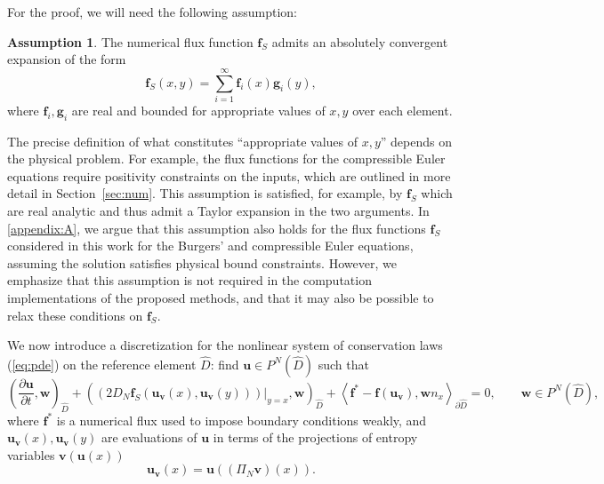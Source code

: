 \documentclass[preprint,10pt]{elsarticle}
\theoremstyle{definition}
\theoremstyle{lemma}
\theoremstyle{theorem}
\theoremstyle{assumption}
\newtheorem{assumption}{Assumption}
\newcommand{\pd}[2]{\frac{\partial#1}{\partial#2}}
\newcommand{\LRp}[1]{\left( #1 \right)}
\newcommand{\LRa}[1]{\left\langle #1 \right\rangle}
\begin{document}
For the proof, we will need the following assumption:
\begin{assumption}
The numerical flux function $\bm{f}_S$ admits an absolutely convergent expansion of the form 
\[
\bm{f}_S(x,y) = \sum_{i=1}^{\infty} \bm{f}_i(x) \bm{g}_i(y), 
\]
where $\bm{f}_i, \bm{g}_i$ are real and bounded for appropriate values of $x,y$ over each element.  
\label{eq:assumption}
\end{assumption}
The precise definition of what constitutes ``appropriate values of $x,y$'' depends on the physical problem.  For example, the flux functions for the compressible Euler equations require positivity constraints on the inputs, which are outlined in more detail in Section~\ref{sec:num}.  This assumption is satisfied, for example, by $\bm{f}_S$ which are real analytic and thus admit a Taylor expansion in the two arguments.  In \ref{appendix:A}, we argue that this assumption also holds for the flux functions $\bm{f}_S$ considered in this work for the Burgers' and compressible Euler equations, assuming the solution satisfies physical bound constraints.  However, we emphasize that this assumption is not required in the computation implementations of the proposed methods, and that it may also be possible to relax these conditions on $\bm{f}_S$.  

We now introduce a discretization for the nonlinear system of conservation laws (\ref{eq:pde}) on the reference element $\widehat{D}$: find $\bm{u}\in P^N\LRp{\widehat{D}}$ such that
\begin{equation}
\LRp{\pd{\bm{u}}{t},\bm{w}}_{\widehat{D}} + \LRp{\left.\LRp{2D_N \bm{f}_S(\bm{u}_{\bm{v}}(x),\bm{u}_{\bm{v}}(y))}\right|_{y=x},\bm{w}}_{\widehat{D}}+ \LRa{\bm{f}^*-\bm{f}(\bm{u}_{\bm{v}}),\bm{w}{n}_x}_{\partial \widehat{D}} = 0, \qquad \bm{w}\in P^N\LRp{\widehat{D}},
\label{eq:ecdg_oneelem}
\end{equation}
where $\bm{f}^*$ is a numerical flux used to impose boundary conditions weakly, and $\bm{u}_{\bm{v}}(x),\bm{u}_{\bm{v}}(y)$ are evaluations of $\bm{u}$ in terms of the projections of entropy variables $\bm{v}(\bm{u}(x))$ 
\begin{equation}
\bm{u}_{\bm{v}}(x) = \bm{u}\LRp{(\Pi_N\bm{v})(x)}.
\label{eq:projectedentropyvars}
\end{equation}
\end{document}

